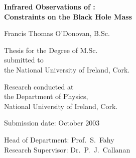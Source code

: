 \thispagestyle{empty}


\begin{center}


\textbf{Infrared Observations of \groj:\\ Constraints on the Black Hole Mass}

\vspace{15mm}

Francis Thomas O'Donovan, B.Sc.

\vspace{35mm}


Thesis for the Degree of M.Sc.\\
\vspace{5mm}
submitted to \\
\vspace{5mm}
the National University of Ireland, Cork.

\vspace{20mm}

Research conducted at \\
\vspace{5mm}
the Department of Physics, \\
\vspace{5mm}
National University of Ireland, Cork.

\vspace{30mm}

Submission date: October 2003

\vspace{15mm}


Head of Department: Prof.~S.~Fahy\\
\vspace{5mm}
Research Supervisor: Dr.~P.~J.~Callanan

\end{center}

